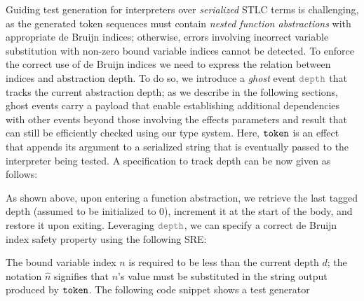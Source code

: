 Guiding test generation for interpreters over \emph{serialized} STLC
terms is challenging, as the generated token sequences must contain
\emph{nested function abstractions} with appropriate de Bruijn
indices; otherwise, errors involving incorrect variable substitution
with non-zero bound variable indices cannot be detected. To enforce
the correct use of de Bruijn indices we need to express the relation
between indices and abstraction depth.  To do so, we introduce a
\emph{ghost} event $\effGray{depth}$ that tracks the current
abstraction depth;  as we describe
in the following sections, ghost events carry a payload that enable
establishing additional dependencies with other events beyond those involving
the effects parameters and result that can still be efficiently checked using
our type system.  Here, $\boldsymbol{{\tt token}}$ is an effect that appends its
argument to a serialized string that is eventually passed to the
interpreter being tested.    A \tyName{} specification to track depth can
  be now given as follows:
  \vspace{-.4cm} \par{}\vspace{-.5cm} \par\nobreak\noindent
  As shown above, upon entering a function abstraction, we retrieve
  the last tagged depth (assumed to be initialized to $0$), increment it at the
  start of the body, and restore it upon exiting. Leveraging
  $\effGray{depth}$, we can specify a correct de Bruijn index
  safety property using the following SRE:
  \vspace{-.4cm} \par{}\vspace{-.5cm} \par\nobreak\noindent
  The bound variable index $n$ is required to be less than the
  current depth $d$; the notation $\widehat{n}$ signifies that $n$'s value must
  be substituted in the string output produced by $\boldsymbol{{\tt token}}$.  The following code snippet shows a test generator

